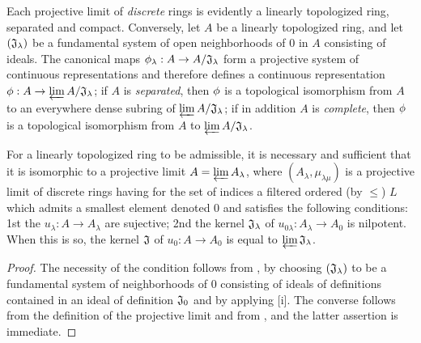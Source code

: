 \begin{env}[7.2.1]
\label{0.7.2.1}
Each projective limit of \emph{discrete} rings is evidently a linearly
topologized ring, separated and compact. Conversely, let $A$ be a linearly
topologized ring, and let $(\mathfrak{J}_\lambda)$ be a fundamental system of
open neighborhoods of $0$ in $A$ consisting of
ideals. The canonical maps $\vphi_\lambda:A\to A/\fk{J}_\lambda$ form
a projective system of continuous representations and therefore defines a
continuous representation $\vphi:A\to\varprojlim A/\fk{J}_\lambda$; if $A$
is \emph{separated}, then $\phi$ is a topological isomorphism from $A$ to an
everywhere dense subring of $\varprojlim A/\mathfrak{J}_\lambda$; if in
addition $A$ is \emph{complete}, then $\phi$ is a topological isomorphism from
$A$ to $\varprojlim A/\mathfrak{J}_\lambda$.
\end{env}

\begin{lem}[7.2.2]
\label{0.7.2.2}
For a linearly topologized ring to be admissible, it is necessary and sufficient
that it is isomorphic to a projective limit $A=\varprojlim A_\lambda$, where
$(A_\lambda,\mu_{\lambda\mu})$ is a projective limit of discrete rings having
for the set of indices a filtered ordered (by $\leqslant$) $L$ which admits
a smallest element denoted $0$ and satisfies the following conditions:
1st the $u_\lambda:A\to A_\lambda$ are sujective;
2nd the kernel $\mathfrak{J}_\lambda$ of
$u_{0\lambda}:A_\lambda\to A_0$ is nilpotent. When this is so, the kernel
$\mathfrak{J}$ of $u_0:A\to A_0$ is equal to $\varprojlim\mathfrak{J}_\lambda$.
\end{lem}

\begin{proof}
\label{proof-0.7.2.2}
The necessity of the condition follows from , by choosing
$(\mathfrak{J}_\lambda)$ to be a fundamental system of neighborhoods of $0$
consisting of ideals of definitions contained in an ideal of definition
$\mathfrak{J}_0$ and by applying [i]. The converse follows
from the definition of the projective limit and from , and the
latter assertion is immediate.
\end{proof}

